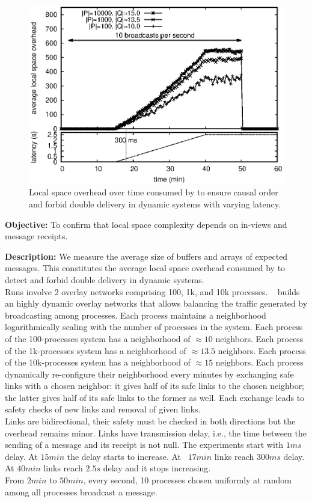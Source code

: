 \begin{figure}
  \begin{center}
    \includegraphics[width=0.8\columnwidth]{./img/overhead.eps}
    \caption{\label{fig:overhead}Local space overhead over time consumed by
      \RPCBROADCAST to ensure causal order and forbid double delivery in dynamic
      systems with varying latency.}
  \end{center}
\end{figure}


\noindent \textbf{Objective:} To confirm that local space complexity
depends on in-views and message receipts.

\noindent \textbf{Description:} We measure the average size of buffers and
arrays of expected messages. This constitutes the average local space overhead
consumed by \RPCBROADCAST to detect and forbid double delivery in dynamic
systems.\\
Runs involve 2 overlay networks comprising 100, 1k, and 10k
processes. \SPRAY~\cite{nedelec2017adaptive} builds an highly dynamic overlay
networks that allows balancing the traffic generated by broadcasting among
processes. Each process maintains a neighborhood logarithmically scaling with
the number of processes in the system. Each process of the 100-processes system
has a neighborhood of $\approx 10$ neighbors. Each process of the 1k-processes
system has a neighborhood of $\approx 13.5$ neighbors. Each process of the
10k-processes system has a neighborhood of $\approx 15$ neighbors. Each process
dynamically re-configure their neighborhood every minutes by exchanging safe
links with a chosen neighbor: it gives half of its safe links to the chosen
neighbor; the latter gives half of its safe links to the former as well. Each
exchange leads to safety checks of new links and removal of given links.\\ Links
are bidirectional, their safety must be checked in both directions but the
overhead remains minor. Links have transmission delay, i.e., the time between
the sending of a message and its receipt is not null. The experiments start with
$1ms$ delay. At $15min$ the delay starts to increase. At ~$17min$ links reach
$300ms$ delay. At $40min$
links reach $2.5s$ delay and it stops increasing.\\
From $2min$ to $50min$, every second, 10 processes chosen uniformly at random
among all processes broadcast a message.

